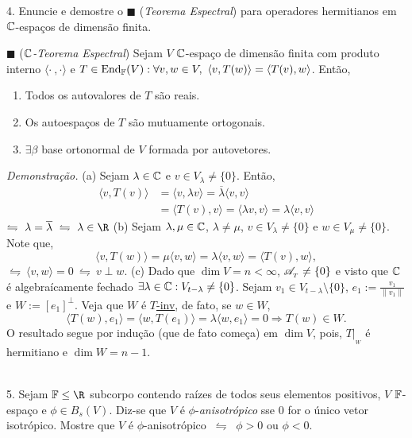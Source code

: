 \hspace{-0.1cm}4. Enuncie e demostre o \(\blacksquare\) (\emph{Teorema Espectral}) para operadores hermitianos em \(\mathbb{C}\)-espaços de dimensão finita. \\ 
    \textcolor{gris}{
        \(\blacksquare\) (\emph{\(\mathbb{C}\)-Teorema Espectral}) Sejam \(V\) \(\mathbb{C}\)-espaço de dimensão finita com produto interno \(\langle\cdot \ ,  \cdot\rangle\) e \(T \in \ehom(V) : \forall v, w \in V, \ \langle v, T(w)\rangle = \langle T(v), w \rangle \). Então,
        \begin{enumerate}[label = (\alph*) ]
            \item Todos os autovalores de \(T\) são reais. 
            \item Os autoespaços de \(T\) são mutuamente ortogonais. 
            \item \(\exists \beta\) base ortonormal de \(V\) formada por autovetores. 
        \end{enumerate}
        \emph{Demonstração.} (a) Sejam \(\lambda \in \mathbb{C}\) e \(v \in V_\lambda\neq \{0\}\). Então, 
        \begin{align*}
        \langle v, T(v)\rangle &=  \langle v, \lambda v\rangle =\overline{\lambda}\langle v, v\rangle \\ 
        &=  \langle T(v), v\rangle = \langle  \lambda v,v\rangle = \lambda\langle v,v\rangle  
        \end{align*}
        \(\leftrightharpoons \ \lambda = \overline{\lambda} \ \leftrightharpoons \ \lambda \in \R\) (b) Sejam \(\lambda, \mu \in \mathbb{C}\), \(\lambda \neq \mu\), \(v\in V_\lambda \neq \{0\} \) e \(w \in V_\mu \neq \{0\}\). Note que,  
        \[\langle v, T(w)\rangle = \mu \langle v, w\rangle = \lambda \langle v , w\rangle  = \langle T(v), w\rangle, \]
        \(\leftrightharpoons\ \langle v, w \rangle = 0 \ \leftrightharpoons \ v \perp w\). (c) Dado que \(\dim V =n <\infty\), \(\mathscr{A}_{_T} \neq \{0\}\) e visto que \(\mathbb{C}\) é algebraícamente fechado \(\exists \lambda \in \mathbb{C} : V_{t-\lambda} \neq \{0\}\). Sejam \(v_1 \in V_{t-\lambda}\setminus \{0\}\), \(e_1 := \frac{v_1}{\|v_1\|}\) e \(W := [e_1]^\perp\). Veja que \(W\) é \underline{\(T\)-inv}, de fato, se \(w\in W\), 
        \[\langle T(w), e_1 \rangle = \langle w, T(e_1)\rangle = \lambda \langle w, e_1 \rangle = 0 \Rightarrow T(w) \in W. \] 
        O resultado segue por indução (que de fato começa) em \(\dim V\), pois, \(T|_{_W}\) é hermitiano e \(\dim W = n-1\). 
    }\\ 
5. Sejam \(\F\leq \R\) subcorpo contendo raízes de todos seus elementos positivos, \(V\) \(\mathbb{F}\)-espaço e \(\phi \in B_s(V)\). Diz-se que \(V\) é \(\phi\)-\emph{anisotrópico} sse \(0\) for o único vetor isotrópico. Mostre que \(V\) é \(\phi\)-anisotrópico \( \ \leftrightharpoons \ \) \(\phi > 0 \) ou \(\phi < 0 \). \\

